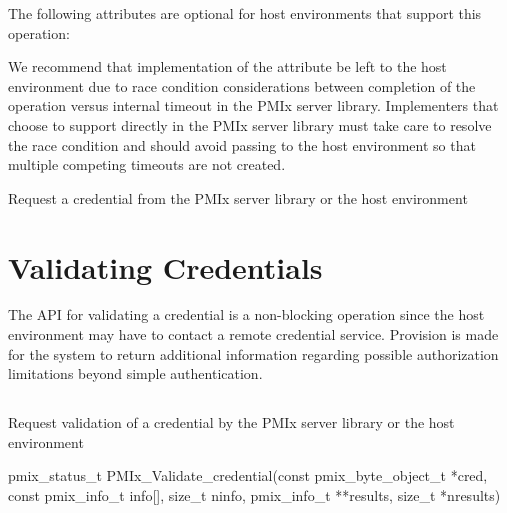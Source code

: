\reqattrend

\optattrstart
The following attributes are optional for host environments that support this operation:


\optattrend

\adviceimplstart
We recommend that implementation of the  attribute be left to the host environment due to race condition considerations between completion of the operation versus internal timeout in the \ac{PMIx} server library. Implementers that choose to support  directly in the \ac{PMIx} server library must take care to resolve the race condition and should avoid passing  to the host environment so that multiple competing timeouts are not created.
\adviceimplend

\descr

Request a credential from the \ac{PMIx} server library or the host environment

\section{Validating Credentials}
\label{chap:api_security:validate}

The \ac{API} for validating a credential is a non-blocking operation since the host environment may have to contact a remote credential service. Provision is made for the system to return additional information regarding possible authorization limitations beyond simple authentication.

\subsection{}

\summary

Request validation of a credential by the \ac{PMIx} server library or the host environment

\format

\cspecificstart
\begin{codepar}
pmix_status_t
PMIx_Validate_credential(const pmix_byte_object_t *cred,
                         const pmix_info_t info[], size_t ninfo,
                         pmix_info_t **results, size_t *nresults)
\end{codepar}
\cspecificend

